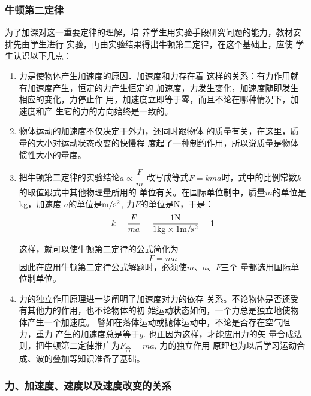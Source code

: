 \subsubsection{牛顿第二定律}

为了加深对这一重要定律的理解，培
养学生用实验手段研究问题的能力，教材安排先由学生进行
实验，再由实验结果得出牛顿第二定律，在这个基础上，应使
学生认识以下几点：
\begin{enumerate}
    \item 力是使物体产生加速度的原因．加速度和力存在着
这样的关系：有力作用就有加速度产生，恒定的力产生恒定的
加速度，力发生变化，加速度随即发生相应的变化，力停止作
用，加速度立即等于零，而且不论在哪种情况下，加速度和产
生它的力的方向始终是一致的。
\item 物体运动的加速度不仅决定于外力，还同时跟物体
的质量有关，在这里，质量的大小对运动状态改变的快慢程
度起了一种制约作用，所以说质量是物体惯性大小的量度。
\item 把牛顿第二定律的实验结论$a\propto \dfrac{F}{m}$
改写成等式$F=kma$时，式中的比例常数$k$的取值跟式中其他物理量所用的
单位有关。在国际单位制中，质量$m$的单位是kg，加速度
$a$的单位是${\rm m/s^2}$, 力$F$的单位是N，于是：
\[k=\frac{F}{ma}=\frac{1{\rm N}}{1{\rm kg}\times 1{\rm m/s^2}}=1\]

这样，就可以使牛顿第二定律的公式简化为
\[F=ma\]
因此在应用牛顿第二定律公式解题时，必须使$m$、$a$、$F$三个
量都选用国际单位制单位。

\item 力的独立作用原理进一步阐明了加速度对力的依存
关系。不论物体是否还受有其他力的作用，也不论物体的初
始运动状态如何，一个力总是独立地使物体产生一个加速度。
譬如在落体运动或抛体运动中，不论是否存在空气阻力，重力
产生的加速度总是等于$g$. 也正因为这样，才能应用力的矢
量合成法则，把牛顿第二定律推广为$F_{\text{合}}=ma$, 力的独立作用
原理也为以后学习运动合成、波的叠加等知识准备了基础。
\end{enumerate}

\subsubsection{力、加速度、速度以及速度改变的关系}

